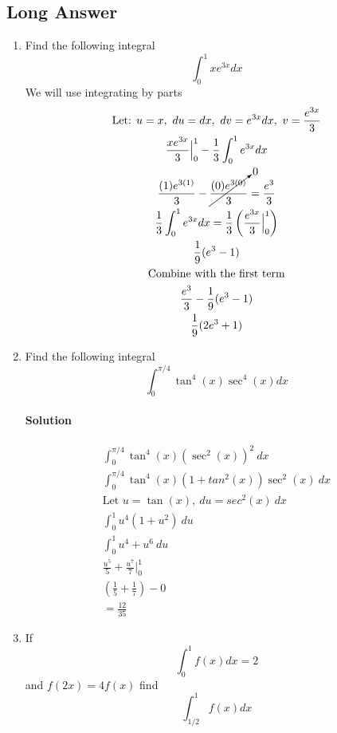 \documentclass[MATH-115-Notes.tex]{subfiles}
\begin{document}
\subsection{Long Answer}
\begin{enumerate}
    \item Find the following integral \[\int_{0}^{1}xe^{3x}dx\]
    We will use integrating by parts
    \begin{gather*}
        \text{Let: } u = x,\ du = dx,\ dv = e^{3x}dx,\ v = \frac{e^{3x}}{3}\\
        \frac{xe^{3x}}{3}\Big|_0^1 - \frac{1}{3} \int_{0}^{1} e^{3x}dx\\
        \frac{(1)e^{3(1)}}{3} - \cancelto{0}{\frac{(0)e^{3(0)}}{3}} = \frac{e^{3}}{3}\\
        \frac{1}{3} \int_{0}^{1} e^{3x}dx = \frac{1}{3} \left( \frac{e^{3x}}{3}\Big|_0^1 \right)\\
        \frac{1}{9}(e^3 - 1)\\
        \text{Combine with the first term}\\
        \frac{e^{3}}{3} - \frac{1}{9}(e^3 - 1)\\
        \frac{1}{9}(2e^3 + 1)
    \end{gather*}


    \item Find the following integral \[\int_{0}^{\pi/4}\tan^4(x)\sec^4(x)dx\]
    \paragraph*{Solution}
    \begin{gather*}
        \int_{0}^{\pi/4} \tan^4(x)(\sec^2(x))^2\ dx\\
        \int_{0}^{\pi/4} \tan^4(x) (1 + tan^2(x)) \sec^2(x)\ dx\\
        \text{Let } u = \tan(x),\ du = sec^2(x)\ dx\\
        \int_{0}^{1} u^4 (1 + u^2)\ du\\
        \int_{0}^{1} u^4 + u^6\ du\\
        \frac{u^5}{5} + \frac{u^7}{7}\Big|_0^1\\
        \left( \frac{1}{5} + \frac{1}{7}  \right) - 0\\
        = \frac{12}{35}
    \end{gather*}


    \item {If} \[\int_{0}^{1}f(x)dx = 2\] {\centering and \(f(2x) = 4f(x)\) find\\} \[\int_{1/2}^{1}f(x)dx\]

\end{enumerate}
\end{document}
